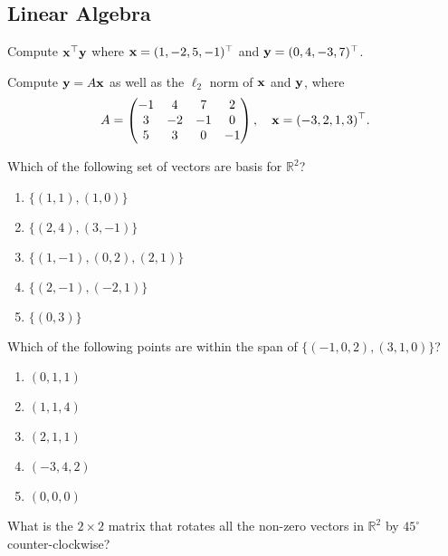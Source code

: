 \subsection{Linear Algebra}

\begin{question}
\label{q:dot_product}
Compute $\mathbf{x}^\top \mathbf{y}$ where $\mathbf{x} = (1, -2, 5, -1)^\top$ and $\mathbf{y} = (0, 4, -3, 7)^\top$.
\end{question}

\begin{question}
\label{q:matrix_product}
Compute $\mathbf{y} = A\mathbf{x}$ as well as the $\ell_2$ norm of $\mathbf{x}$ and $\mathbf{y}$, where
\begin{equation*}
A = \begin{pmatrix}
-1 & 4 & 7 & 2 \\
3 & -2 & -1 & 0 \\
5 & 3 & 0 & -1
\end{pmatrix}, \quad \mathbf{x} = (-3, 2, 1, 3)^\top.
\end{equation*}
\end{question}

\begin{question}[Basis]
\label{q:basis}
Which of the following set of vectors are basis for $\mathbb{R}^2$?
\begin{enumerate}
    \item $\{(1, 1), (1, 0) \}$
    \item $\{(2, 4), (3, -1) \}$
    \item $\{(1, -1), (0, 2), (2, 1) \}$
    \item $\{(2, -1), (-2, 1) \}$
    \item $\{(0, 3) \}$
\end{enumerate}
\end{question}

\begin{question} 
\label{q:span}
Which of the following points are within the span of $\{(-1, 0, 2), (3, 1, 0) \}$?
\begin{enumerate}
    \item $(0, 1, 1)$
    \item $(1, 1, 4)$
    \item $(2, 1, 1)$
    \item $(-3, 4, 2)$
    \item $(0, 0, 0)$
\end{enumerate}
\end{question}

\begin{question}
\label{q:rotation_matrix}
What is the $2 \times 2$ matrix that rotates all the non-zero vectors in $\mathbb{R}^2$ by $45^{\circ}$ counter-clockwise?

\end{question}

